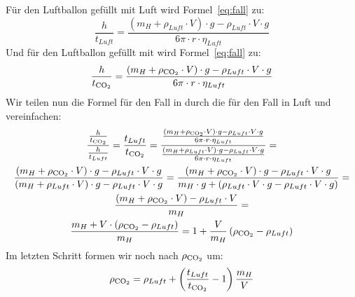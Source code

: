 \documentclass{article}
\begin{document}
    Für den Luftballon gefüllt mit Luft wird Formel~\ref{eq:fall} zu:
    \begin{equation} \label{eq:fall_luft}
        \frac{h}{t_{Luft}} = \frac{ \left( m_H + \rho_{Luft} \cdot V \right) \cdot g - \rho_{Luft} \cdot V \cdot g }{ 6 \pi \cdot r \cdot \eta_{Luft} }
    \end{equation}
    Und für den Luftballon gefüllt mit  wird Formel~\ref{eq:fall} zu:
    \begin{equation} \label{eq:fall_co2}
        \frac{h}{t_{\ce{CO2}}} = \frac{ \left( m_H + \rho_{\ce{CO2}} \cdot V \right) \cdot g - \rho_{Luft} \cdot V \cdot g }{ 6 \pi \cdot r \cdot \eta_{Luft} }
    \end{equation}
    Wir teilen nun die Formel für den Fall in  durch die für den Fall in Luft und vereinfachen:
    \begin{equation} \label{eq:calc_rho_faktor}
        \begin{gathered}
            \frac{ \frac{h}{t_{\ce{CO2}}} }{ \frac{h}{t_{Luft}} } = \frac{ t_{Luft} }{ t_{\ce{CO2}} } =
            \frac{ \frac{ \left( m_H + \rho_{\ce{CO2}} \cdot V \right) \cdot g - \rho_{Luft} \cdot V \cdot g }{ 6 \pi \cdot r \cdot \eta_{Luft} } }
                 { \frac{ \left( m_H + \rho_{Luft} \cdot V \right) \cdot g - \rho_{Luft} \cdot V \cdot g }{ 6 \pi \cdot r \cdot \eta_{Luft} } } = \\
            \frac{ \left( m_H + \rho_{\ce{CO2}} \cdot V \right) \cdot g - \rho_{Luft} \cdot V \cdot g }{ \left( m_H + \rho_{Luft} \cdot V \right) \cdot g - \rho_{Luft} \cdot V \cdot g } =
            \frac{ \left( m_H + \rho_{\ce{CO2}} \cdot V \right) \cdot g - \rho_{Luft} \cdot V \cdot g }{ m_H \cdot g + \left( \rho_{Luft} \cdot V \cdot g - \rho_{Luft} \cdot V \cdot g \right) } = \\
            \frac{ \left( m_H + \rho_{\ce{CO2}} \cdot V \right) - \rho_{Luft} \cdot V }{ m_H } = \\
            \frac{ m_H + V \cdot \left( \rho_{\ce{CO2}} - \rho_{Luft} \right)}{ m_H } = 1 + \frac{V}{m_H} \left( \rho_{\ce{CO2}} - \rho_{Luft} \right)
        \end{gathered}
    \end{equation} 
    Im letzten Schritt formen wir noch nach \(\rho_{\ce{CO2}}\) um:
    \begin{equation} \label{eq:calc_rho_co2}
        \rho_{\ce{CO2}} = \rho_{Luft} + \left( \frac{t_{Luft}}{t_{\ce{CO2}}} - 1 \right) \frac{m_H}{V}
    \end{equation}
\end{document}
